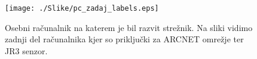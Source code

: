 \begin{figure}
	\centering
	\texttt{[image: ./Slike/pc\_zadaj\_labels.eps]}
	\caption{Osebni ra\v{c}unalnik na katerem je bil razvit stre\v{z}nik. Na sliki vidimo zadnji del ra\v{c}unalnika kjer so priklju\v{c}ki za ARCNET omre\v{z}je ter JR3 senzor.}
	\label{fig:pc_zadaj_labels}
\end{figure}
